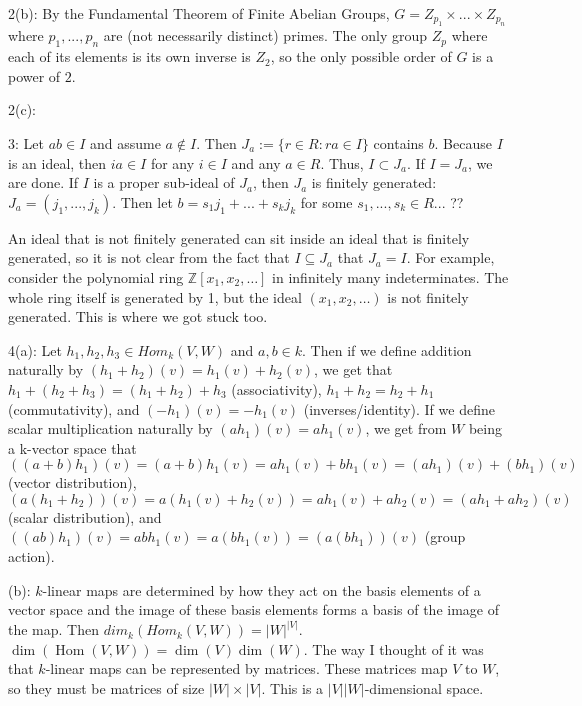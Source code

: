 \documentclass[12pt]{article}
\newcommand{\Z}{\mathbb{Z}}
\DeclareMathOperator{\Hom}{Hom}
\begin{document}
2(b): By the Fundamental Theorem of Finite Abelian Groups, $G=Z_{p_1} \times ... \times Z_{p_n}$ where $p_1,...,p_n$ are (not necessarily distinct) primes. The only group $Z_p$ where each of its elements is its own inverse is $Z_2$, so the only possible order of $G$ is a power of $2$. \newline

2(c): \newline

3: Let $ab \in I$ and assume $a \notin I$. Then $J_a := \{ r \in R:ra \in I\}$ contains $b$. Because $I$ is an ideal, then $i a \in I$ for any $i \in I$ and any $a \in R$. Thus, $I \subset J_a$. If $I = J_a$, we are done. If $I$ is a proper sub-ideal of $J_a$, then $J_a$ is finitely generated: $J_a = (j_1,...,j_k)$. Then let $b=s_1 j_1 + ... + s_k j_k$ for some $s_1,...,s_k \in R$... ??

{\color{blue} An ideal that is not finitely generated can sit inside an ideal that is finitely generated, so it is not clear from the fact that $I \subseteq J_a$ that $J_a = I$. For example, consider the polynomial ring $\Z[x_1, x_2, \ldots]$ in infinitely many indeterminates. The whole ring itself is generated by 1, but the ideal $(x_1, x_2, \ldots)$ is not finitely generated. This is where we got stuck too.}\newline

4(a): Let $h_1,h_2,h_3 \in Hom_k(V,W)$ and $a,b \in k$. Then if we define addition naturally by $(h_1+h_2)(v)=h_1(v)+h_2(v)$, we get that $h_1+(h_2+h_3)=(h_1+h_2)+h_3$ (associativity), $h_1+h_2=h_2+h_1$ (commutativity), and $(-h_1)(v)=-h_1(v)$ (inverses/identity). If we define scalar multiplication naturally by $(ah_1)(v) = a h_1(v)$, we get from $W$ being a k-vector space that $((a+b)h_1)(v)=(a+b)h_1(v)=a h_1(v) + b h_1(v) = (a h_1)(v) + (b h_1)(v)$ (vector distribution), $(a(h_1 + h_2))(v) = a(h_1(v) + h_2(v))=a h_1(v) + a h_2(v) = (a h_1 + a h_2)(v)$ (scalar distribution), and $((ab) h_1)(v)=abh_1(v)=a(bh_1(v))=(a(bh_1))(v)$ (group action). \newline

(b): $k$-linear maps are determined by how they act on the basis elements of a vector space and the image of these basis elements forms a basis of the image of the map. Then $dim_k(Hom_k(V,W))=|W|^{|V|}$. \\
{\color{blue} $\dim(\Hom(V,W)) = \dim(V) \dim(W)$. The way I thought of it was that $k$-linear maps can be represented by matrices. These matrices map $V$ to $W$, so they must be matrices of size $|W| \times |V|$. This is a $|V||W|$-dimensional space.} \newline
\end{document}
